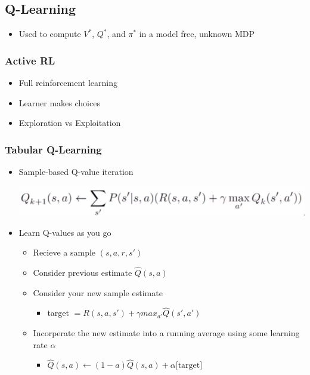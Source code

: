 \documentclass[11pt]{article}
\begin{document}
\subsection{Q-Learning}
\label{sec:org2e4f2b3}
\begin{itemize}
\item Used to compute \(V^*\), \(Q^*\), and \(\pi^*\) in a model free, unknown MDP
\end{itemize}
\subsubsection{Active RL}
\label{sec:org2636229}
\begin{itemize}
\item Full reinforcement learning
\item Learner makes choices
\item Exploration vs Exploitation
\end{itemize}
\subsubsection{Tabular Q-Learning}
\label{sec:org7d7aa6d}
\begin{itemize}
\item Sample-based Q-value iteration
\begin{center}
\includegraphics[width=.9\linewidth]{images/2020-09-17_17-26-24_screenshot.png}
\end{center}
\item Learn Q-values as you go
\begin{itemize}
\item Recieve a sample \((s, a, r, s')\)
\item Consider previous estimate \(\hat{Q}(s, a)\)
\item Consider your new sample estimate
\begin{itemize}
\item target \(= R(s,a,s')+\gamma max_{a'}\hat{Q}(s', a')\)
\end{itemize}
\item Incorperate the new estimate into a running average using some learning rate \(\alpha\)
\begin{itemize}
\item \(\hat{Q}(s, a) \leftarrow (1 - a)\hat{Q}(s, a) + \alpha\text{[target]}\)
\end{itemize}
\end{itemize}
\end{itemize}
\end{document}
